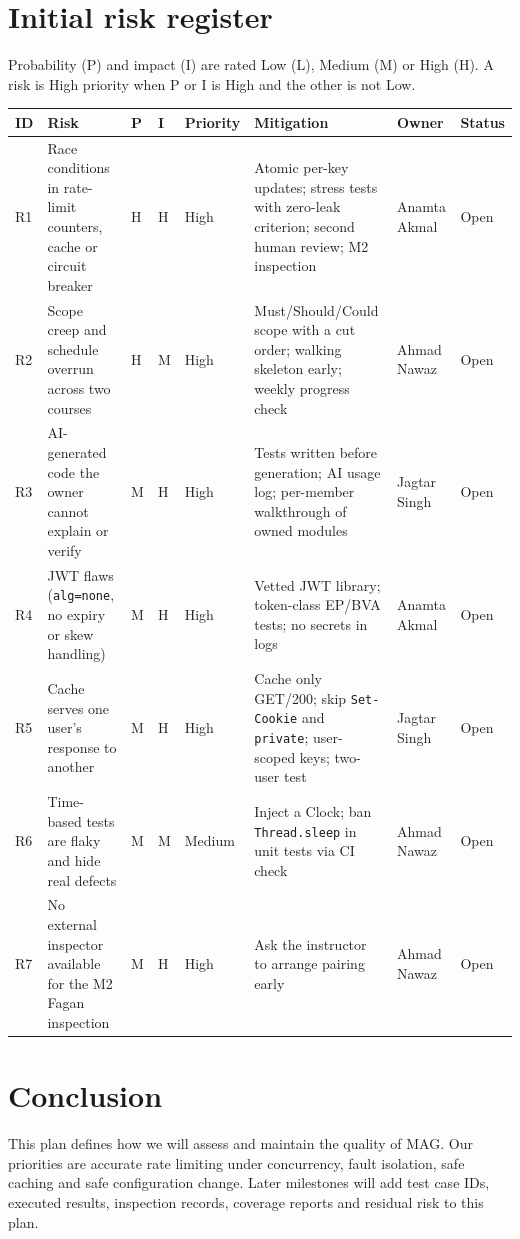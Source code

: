 \documentclass[11pt,a4paper]{article}
\newcommand{\ma}{Ahmad Nawaz}
\newcommand{\mb}{Anamta Akmal}
\newcommand{\mc}{Jagtar Singh}
\begin{document}
\section{Initial risk register}
Probability (P) and impact (I) are rated Low (L), Medium (M) or High (H). A risk is High priority when P or I is High and the other is not Low.

\begin{longtable}{L{0.8cm} L{3.4cm} L{0.5cm} L{0.5cm} L{1.4cm} L{4.1cm} L{1.7cm} L{1.1cm}}
\toprule
\textbf{ID} & \textbf{Risk} & \textbf{P} & \textbf{I} & \textbf{Priority} & \textbf{Mitigation} & \textbf{Owner} & \textbf{Status} \\
\midrule
\endhead
R1 & Race conditions in rate-limit counters, cache or circuit breaker & H & H & High & Atomic per-key updates; stress tests with zero-leak criterion; second human review; M2 inspection & \mb & Open \\
R2 & Scope creep and schedule overrun across two courses & H & M & High & Must/Should/Could scope with a cut order; walking skeleton early; weekly progress check & \ma & Open \\
R3 & AI-generated code the owner cannot explain or verify & M & H & High & Tests written before generation; AI usage log; per-member walkthrough of owned modules & \mc & Open \\
R4 & JWT flaws (\texttt{alg=none}, no expiry or skew handling) & M & H & High & Vetted JWT library; token-class EP/BVA tests; no secrets in logs & \mb & Open \\
R5 & Cache serves one user's response to another & M & H & High & Cache only GET/200; skip \texttt{Set-Cookie} and \texttt{private}; user-scoped keys; two-user test & \mc & Open \\
R6 & Time-based tests are flaky and hide real defects & M & M & Medium & Inject a Clock; ban \texttt{Thread.sleep} in unit tests via CI check & \ma & Open \\
R7 & No external inspector available for the M2 Fagan inspection & M & H & High & Ask the instructor to arrange pairing early & \ma & Open \\
\bottomrule
\end{longtable}

\section*{Conclusion}
This plan defines how we will assess and maintain the quality of MAG. Our priorities are accurate rate limiting under concurrency, fault isolation, safe caching and safe configuration change. Later milestones will add test case IDs, executed results, inspection records, coverage reports and residual risk to this plan.
\end{document}
